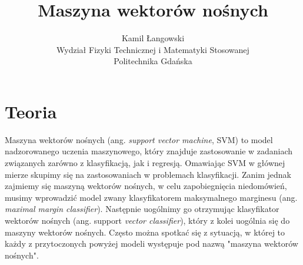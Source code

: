 \documentclass[a4paper]{article}
\title{Maszyna wektorów nośnych}
\author{Kamil Łangowski \\ Wydział Fizyki Technicznej i Matematyki Stosowanej \\ Politechnika Gdańska}
\begin{document}
\maketitle
\newpage
\section{Teoria}
Maszyna wektorów nośnych (ang.  \textit{support vector machine}, SVM) to model nadzorowanego uczenia maszynowego, który znajduje zastosowanie w zadaniach związanych zarówno z klasyfikacją, jak i regresją. Omawiając SVM w głównej mierze skupimy się na zastosowaniach w problemach klasyfikacji. Zanim jednak zajmiemy się maszyną wektorów nośnych, w celu zapobiegnięcia niedomówień, musimy wprowadzić model zwany klasyfikatorem maksymalnego marginesu (ang. \textit{maximal margin classifier}). Następnie uogólnimy go otrzymując klasyfikator wektorów nośnych (ang. support \textit{vector classifier}), który z kolei uogólnia się do maszyny wektorów nośnych. Często można spotkać się z sytuacją, w której to każdy z przytoczonych powyżej modeli występuje pod nazwą "maszyna wektorów nośnych".
\end{document}
